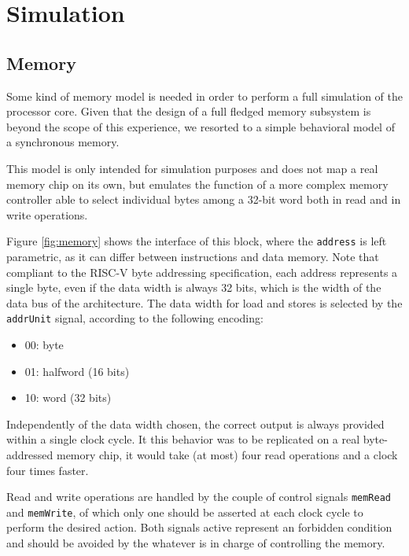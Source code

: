 \documentclass[a4paper]{article}
\begin{document}
\section{Simulation}
\subsection{Memory}\label{sec:memory}
Some kind of memory model is needed in order to perform a full simulation of the processor core. Given that the design of a full fledged memory subsystem is beyond the scope of this experience, we resorted to a simple behavioral model of a synchronous memory.

This model is only intended for simulation purposes and does not map a real memory chip on its own, but emulates the function of a more complex memory controller able to select individual bytes among a 32-bit word both in read and in write operations.

Figure \ref{fig:memory} shows the interface of this block, where the \texttt{address} is left parametric, as it can differ between instructions and data memory. Note that compliant to the RISC-V byte addressing specification, each address represents a single byte, even if the data width is always 32 bits, which is the width of the data bus of the architecture. The data width for load and stores is selected by the \texttt{addrUnit} signal, according to the following encoding:
\begin{itemize}
    \item 00: byte
    \item 01: halfword (16 bits)
    \item 10: word (32 bits)
\end{itemize}
Independently of the data width chosen, the correct output is always provided within a single clock cycle. It this behavior was to be replicated on a real byte-addressed memory chip, it would take (at most) four read operations and a clock four times faster.

Read and write operations are handled by the couple of control signals \texttt{memRead} and \texttt{memWrite}, of which only one should be asserted at each clock cycle to perform the desired action. Both signals active represent an forbidden condition and should be avoided by the whatever is in charge of controlling the memory.
\end{document}
